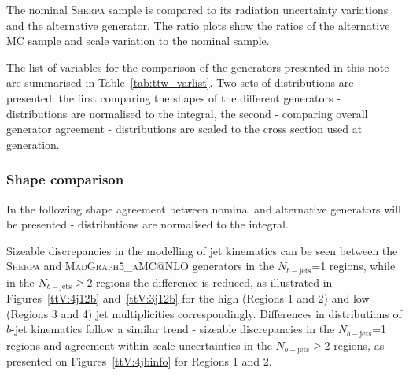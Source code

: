 The nominal  \textsc{Sherpa} \ttW  sample is compared to its radiation uncertainty variations and the alternative generator.
The ratio plots show the ratios of the alternative MC sample and scale variation to the nominal sample.

The list of variables for the comparison of the \ttW generators presented in this note are summarised in Table~\ref{tab:ttw_varlist}.
Two sets of distributions are presented: the first comparing the shapes of the different generators - distributions are normalised to the integral, the second - comparing overall generator agreement - distributions are scaled to the cross section used at generation. %

\subsubsection{Shape comparison}
\label{sec:ttw_shape}
In the following shape agreement between nominal and alternative generators will be presented - distributions are normalised to the integral.

Sizeable discrepancies in the modelling of jet kinematics can be seen between the \textsc{Sherpa} \ttW and \textsc{MadGraph5\_aMC@NLO} generators in the $N_{b-\mathrm{jets}}$=1 regions, while in the $N_{b-\mathrm{jets}}\geq$2 regions the difference is reduced, as illustrated in Figures~\ref{ttV:4j12b} and~\ref{ttV:3j12b} for the high (Regions 1 and 2) and low (Regions 3 and 4) jet multiplicities correspondingly. 
Differences in distributions of $b$-jet kinematics follow a similar trend - sizeable discrepancies in the $N_{b-\mathrm{jets}}$=1 regions and agreement within scale uncertainties in the $N_{b-\mathrm{jets}}\geq$2 regions, as presented on Figures~\ref{ttV:4jbinfo} for Regions 1 and 2.


